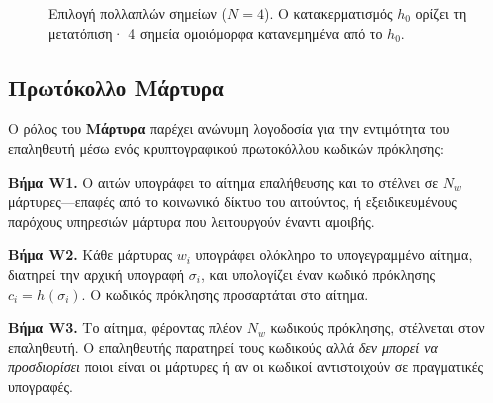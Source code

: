 \documentclass[11pt,a4paper,twocolumn]{article}
\begin{document}
\begin{figure}[ht]
\centering
{}
\caption{Επιλογή πολλαπλών σημείων ($N{=}4$). Ο κατακερματισμός $h_0$ ορίζει τη μετατόπιση· 4 σημεία ομοιόμορφα κατανεμημένα από το $h_0$.}
\label{fig:multipoint}
\end{figure}

\subsection{Πρωτόκολλο Μάρτυρα}

Ο ρόλος του \textbf{Μάρτυρα} παρέχει ανώνυμη λογοδοσία για την εντιμότητα του επαληθευτή μέσω ενός κρυπτογραφικού πρωτοκόλλου κωδικών πρόκλησης:

\textbf{Βήμα W1.} Ο αιτών υπογράφει το αίτημα επαλήθευσης και το στέλνει σε $N_w$ μάρτυρες---επαφές από το κοινωνικό δίκτυο του αιτούντος, ή εξειδικευμένους παρόχους υπηρεσιών μάρτυρα που λειτουργούν έναντι αμοιβής.

\textbf{Βήμα W2.} Κάθε μάρτυρας $w_i$ υπογράφει ολόκληρο το υπογεγραμμένο αίτημα, διατηρεί την αρχική υπογραφή $\sigma_i$, και υπολογίζει έναν κωδικό πρόκλησης $c_i = h(\sigma_i)$. Ο κωδικός πρόκλησης προσαρτάται στο αίτημα.

\textbf{Βήμα W3.} Το αίτημα, φέροντας πλέον $N_w$ κωδικούς πρόκλησης, στέλνεται στον επαληθευτή. Ο επαληθευτής παρατηρεί τους κωδικούς αλλά \emph{δεν μπορεί να προσδιορίσει} ποιοι είναι οι μάρτυρες ή αν οι κωδικοί αντιστοιχούν σε πραγματικές υπογραφές.
\end{document}
